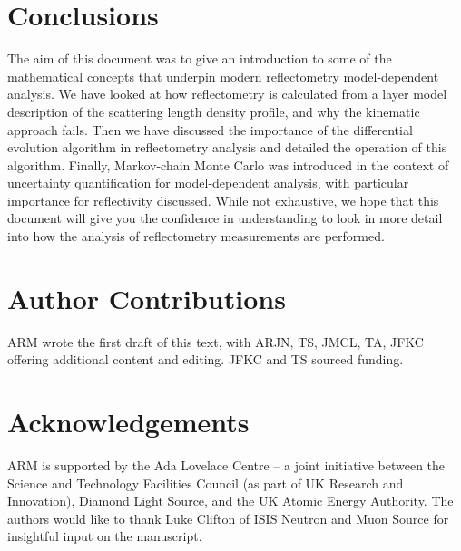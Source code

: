 \documentclass[
 reprint,
 superscriptaddress,
 amsmath,amssymb,
 aps,
]{revtex4-1}
\begin{document}
\section{Conclusions}
The aim of this document was to give an introduction to some of the mathematical concepts that underpin modern reflectometry model-dependent analysis.
We have looked at how reflectometry is calculated from a layer model description of the scattering length density profile, and why the kinematic approach fails.
Then we have discussed the importance of the differential evolution algorithm in reflectometry analysis and detailed the operation of this algorithm.
Finally, Markov-chain Monte Carlo was introduced in the context of uncertainty quantification for model-dependent analysis, with particular importance for reflectivity discussed.
While not exhaustive, we hope that this document will give you the confidence in understanding to look in more detail into how the analysis of reflectometry measurements are performed.

\section*{Author Contributions}
ARM wrote the first draft of this text, with ARJN, TS, JMCL, TA, JFKC offering additional content and editing.
 JFKC and TS sourced funding.


\section*{Acknowledgements}
ARM is supported by the Ada Lovelace Centre -- a joint initiative between the Science and Technology Facilities Council (as part of UK Research and Innovation), Diamond Light Source, and the UK Atomic Energy Authority.
The authors would like to thank Luke Clifton of ISIS Neutron and Muon Source for insightful input on the manuscript.




\end{document}

